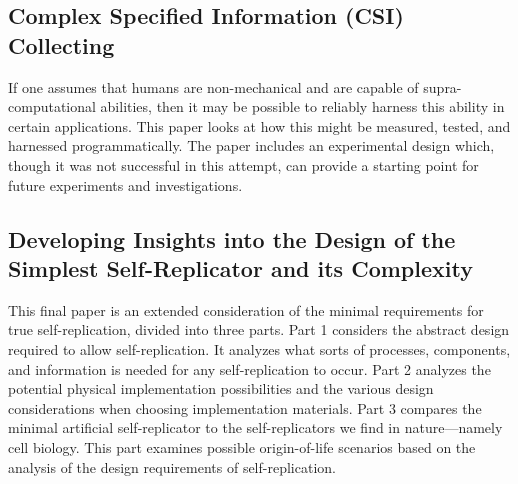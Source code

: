 \subsection*{Complex Specified Information (CSI) Collecting}

If one assumes that humans are non-mechanical and are capable of supra-computational abilities, then
it may be possible to reliably harness this ability in certain applications.  This paper looks at
how this might be measured, tested, and harnessed programmatically.  The paper includes an experimental
design which, though it was not successful in this attempt, can provide a starting point for future
experiments and investigations.

\subsection*{Developing Insights into the Design of the Simplest Self-Replicator and its Complexity}

This final paper is an extended consideration of the minimal requirements for true self-replication, divided
into three parts.  Part 1 considers the abstract design required to allow self-replication.  It analyzes
what sorts of processes, components, and information is needed for any self-replication to occur.  
Part 2 analyzes the potential physical implementation possibilities and the various design considerations
when choosing implementation materials.  Part 3 compares the minimal artificial self-replicator to 
the self-replicators we find in nature---namely cell biology.  This part examines possible origin-of-life
scenarios based on the analysis of the design requirements of self-replication.

